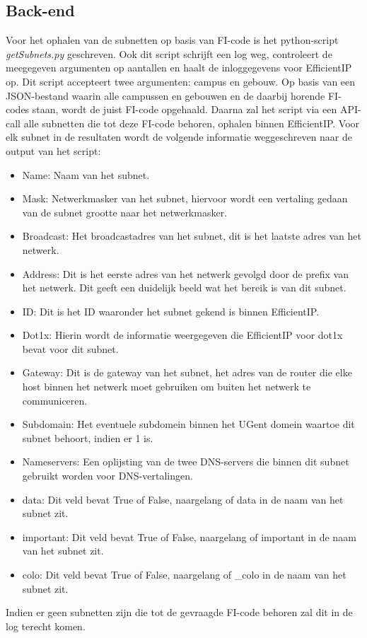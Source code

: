 \subsection{Back-end}
Voor het ophalen van de subnetten op basis van FI-code is het python-script \textit{getSubnets.py} geschreven. Ook dit script schrijft een log weg, controleert de meegegeven argumenten op aantallen en haalt de inloggegevens voor EfficientIP op. Dit script accepteert twee argumenten: campus en gebouw. Op basis van een JSON-bestand waarin alle campussen en gebouwen en de daarbij horende FI-codes staan, wordt de juist FI-code opgehaald. Daarna zal het script via een API-call alle subnetten die tot deze FI-code behoren, ophalen binnen EfficientIP. Voor elk subnet in de resultaten wordt de volgende informatie weggeschreven naar de output van het script:
\begin{itemize}
    \item Name: Naam van het subnet.
    \item Mask: Netwerkmasker van het subnet, hiervoor wordt een vertaling gedaan van de subnet grootte naar het netwerkmasker.
    \item Broadcast: Het broadcastadres van het subnet, dit is het laatste adres van het netwerk.
    \item Address: Dit is het eerste adres van het netwerk gevolgd door de prefix van het netwerk. Dit geeft een duidelijk beeld wat het bereik is van dit subnet.
    \item ID: Dit is het ID waaronder het subnet gekend is binnen EfficientIP.
    \item Dot1x: Hierin wordt de informatie weergegeven die EfficientIP voor dot1x bevat voor dit subnet.
    \item Gateway: Dit is de gateway van het subnet, het adres van de router die elke host binnen het netwerk moet gebruiken om buiten het netwerk te communiceren.
    \item Subdomain: Het eventuele subdomein binnen het UGent domein waartoe dit subnet behoort, indien er 1 is.
    \item Nameservers: Een oplijsting van de twee DNS-servers die binnen dit subnet gebruikt worden voor DNS-vertalingen.
    \item data: Dit veld bevat True of False, naargelang of data in de naam van het subnet zit.
    \item important: Dit veld bevat True of False, naargelang of important in de naam van het subnet zit.
    \item colo: Dit veld bevat True of False, naargelang of \_colo in de naam van het subnet zit.
\end{itemize}
Indien er geen subnetten zijn die tot de gevraagde FI-code behoren zal dit in de log terecht komen.

